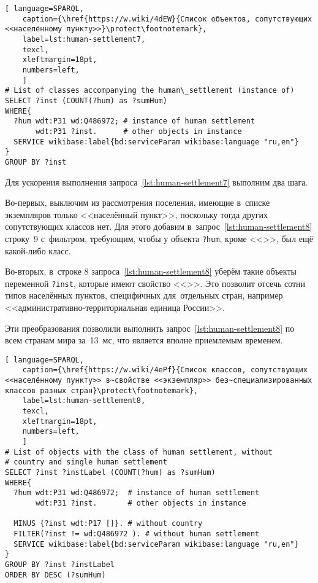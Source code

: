 \begin{lstlisting}[ language=SPARQL, 
    caption={\href{https://w.wiki/4dEW}{Cписок объектов, сопутствующих <<населённому пункту>>}\protect\footnotemark},
    label=lst:human-settlement7,
    texcl,
    xleftmargin=18pt, 
    numbers=left,
    ]
# List of classes accompanying the human\_settlement (instance of)
SELECT ?inst (COUNT(?hum) as ?sumHum) 
WHERE{          
  ?hum wdt:P31 wd:Q486972; # instance of human settlement
       wdt:P31 ?inst.      # other objects in instance
  SERVICE wikibase:label{bd:serviceParam wikibase:language "ru,en"}
}  
GROUP BY ?inst
\end{lstlisting}%

Для ускорения выполнения запроса~\ref{lst:human-settlement7} выполним два шага.
 
Во-первых, выключим из рассмотрения поселения, 
имеющие в~списке экземпляров только <<населённый пункт>>, 
поскольку тогда других сопутствующих классов нет. 
Для этого добавим в~запрос~\ref{lst:human-settlement8} строку~\num{9} с~фильтром, 
требующим, чтобы у объекта \lstinline|?hum|, 
кроме  <<>>, был ещё какой-либо класс.

Во-вторых, в~строке \num{8} запроса~\ref{lst:human-settlement8} 
уберём такие объекты переменной \lstinline|?inst|, 
которые имеют свойство <<>>. 
Это позволит отсечь сотни типов населённых пунктов, специфичных для~отдельных стран, 
например <<административно-территориальная единица России>>.

Эти преобразования позволили выполнить запрос~\ref{lst:human-settlement8} 
по всем странам мира за~13~мс, что является вполне приемлемым временем.


\newpage
\lstset{numbers=left, firstnumber=1, frame=single}
\begin{lstlisting}[ language=SPARQL, 
    caption={\href{https://w.wiki/4ePf}{Cписок классов, сопутствующих <<населённому пункту>> в~свойстве <<экземпляр>> без~специализированных классов разных стран}\protect\footnotemark},
    label=lst:human-settlement8,
    texcl,
    xleftmargin=18pt, 
    numbers=left,
    ]
# List of objects with the class of human settlement, without 
# country and single human settlement
SELECT ?inst ?instLabel (COUNT(?hum) as ?sumHum) 
WHERE{ 
  ?hum wdt:P31 wd:Q486972;  # instance of human settlement
       wdt:P31 ?inst.       # other objects in instance
  
  MINUS {?inst wdt:P17 []}. # without country
  FILTER(?inst != wd:Q486972 ). # without human settlement
  SERVICE wikibase:label{bd:serviceParam wikibase:language "ru,en"}
}  
GROUP BY ?inst ?instLabel
ORDER BY DESC (?sumHum)
\end{lstlisting}%

